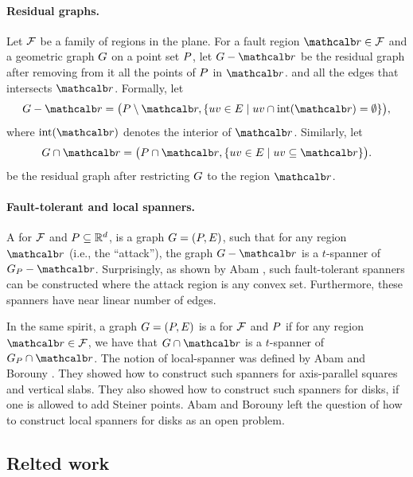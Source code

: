 \documentclass[12pt]{article}%
\begin{document}
\paragraph{Residual graphs.}

Let $\mathcal{F}$ be a family of regions in the plane. For a fault region
$\region \in \FF$ and a geometric graph $G$ on a point set $P$, let
$\G \gminus \region$ be the residual graph after removing from it all
the points of $P$ in $\region$. and all the edges that intersects
$\region$.  Formally, let
\begin{equation*}
    \G \gminus \region%
    =%
    \bigl( \PS \setminus \region, \Set{ uv \in \EG }{ uv \cap
       \interiorX{\region} = \emptyset} \bigr),
\end{equation*}
where $\interiorX{\region}$ denotes the interior of
$\region$. Similarly, let
\begin{equation*}
    \restrictY{\G}{\region}%
    =%
    \bigl( \PS \cap {\region},
    \Set{uv \in \EG}{ uv \subseteq {\region} } \bigr).
\end{equation*}
be the residual graph after restricting $G$ to the region $\region$.

\paragraph{Fault-tolerant and local spanners.}

A  for $\mathcal{F}$ and $P\subseteq \mathbb{R}^d$, is a graph $G=(P, E)$, such that
for any region $\region$ (i.e., the ``attack''), the graph
$\G \gminus \region$ is a $t$-spanner of $\G_\PS - \region$. Surprisingly, as shown by Abam \etal \cite{abfg-rftgs-09},
such fault-tolerant spanners can be constructed where the  attack
region is any convex set. Furthermore, these spanners have near linear
number of edges.

In the same spirit, a graph $G=(P, E)$ is a  for $\mathcal{F}$ and $P$
if for any region $\region \in \FF$, we have that
$\restrictY{\G}{\region}$ is a $t$-spanner of $\G_\PS \cap \region$.  The
notion of local-spanner was defined by Abam and Borouny
\cite{ab-lgs-21}. They showed how to construct such spanners for
axis-parallel squares and vertical slabs. They also showed how to
construct such spanners for disks, if one is allowed to add Steiner
points. Abam and Borouny left the question of how to construct local
spanners for disks as an open problem.

\subsection*{Relted work}
\end{document}
